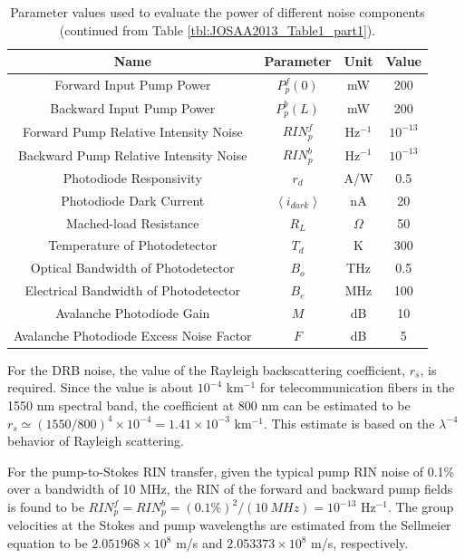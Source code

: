 \begin{table}[t]
\begin{centering}
\begin{tabular}{|c|c|c|c|} \hline
Name & Parameter & Unit & Value\\ \hline\hline
Forward Input Pump Power & $P_p^f(0)$ & mW & 200 \\ \hline
Backward Input Pump Power & $P_p^b(L)$ & mW & 200 \\ \hline
Forward Pump Relative Intensity Noise & $RIN_p^f$ & Hz$^{-1}$ & $10^{-13}$ \\ \hline
Backward Pump Relative Intensity Noise & $RIN_p^b$ & Hz$^{-1}$ & $10^{-13}$ \\ \hline
Photodiode Responsivity & $r_d$ & A/W & 0.5 \\ \hline
Photodiode Dark Current & $\left\langle i_{dark}\right\rangle$ & nA & 20 \\ \hline
Mached-load Resistance & $R_L$ & $\Omega$ & 50\\ \hline
Temperature of Photodetector & $T_d$ & K & 300 \\ \hline
Optical Bandwidth of Photodetector & $B_o$ & THz & 0.5 \\ \hline
Electrical Bandwidth of Photodetector & $B_e$ & MHz & 100 \\ \hline
Avalanche Photodiode Gain & $M$ & dB & 10 \\ \hline
Avalanche Photodiode Excess Noise Factor & $F$ & dB & 5 \\ \hline
\end{tabular}
\caption{Parameter values used to evaluate the power of different noise components (continued from Table \ref{tbl:JOSAA2013_Table1_part1}).}
\label{tbl:JOSAA2013_Table1_part2}
\end{centering}
\end{table}

For the DRB noise, the value of the Rayleigh backscattering coefficient, $r_s$, is required. Since the value is about $10^{-4}$ km$^{-1}$ for telecommunication fibers in the 1550 nm spectral band, the coefficient at 800 nm can be estimated to be  $r_s \simeq (1550/800)^4 \times 10^{-4} = 1.41 \times 10^{-3}$ km$^{-1}$. This estimate is based on the $\lambda^{-4}$ behavior of Rayleigh scattering.

For the pump-to-Stokes RIN transfer, given the typical pump RIN noise of 0.1\% over a bandwidth of 10 MHz, the RIN of the forward and backward pump fields is found to be $RIN_p^f = RIN_p^b = (0.1\%)^2/(\SI{10}{MHz}) = 10^{-13}$ Hz$^{-1}$. The group velocities at the Stokes and pump wavelengths are estimated from the Sellmeier equation to be $2.051968 \times 10^8$ m/s and $2.053373 \times 10^8$ m/s, respectively.

